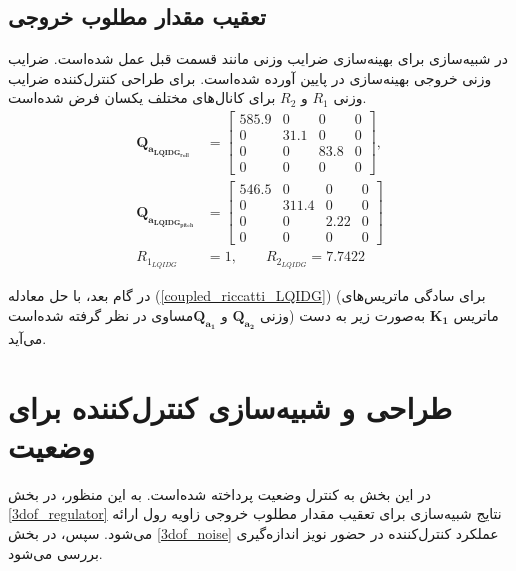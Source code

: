 \documentclass{CCI2020}
\begin{document}
	\subsection{تعقیب مقدار مطلوب خروجی}\label{roll_pitch_regulator}
	
	در شبیه‌سازی برای بهینه‌سازی ضرایب وزنی مانند قسمت قبل عمل شده‌است.
	ضرایب وزنی خروجی بهینه‌سازی در پایین آورده شده‌است. برای طراحی کنترل‌کننده
	ضرایب وزنی
	$R_1$
	و
	$R_2$
	برای کانال‌های مختلف یکسان فرض شده‌است.
	\begin{equation}
		\begin{split}
			\boldsymbol{Q_{a_{LQIDG_{roll}}}} &= \begin{bmatrix}
				585.9 &0& 0& 0\\
				0 &  31.1 & 0 &0 \\
				0 & 0 & 83.8 & 0\\
				0 & 0 & 0 & 0
			\end{bmatrix} ,\\
			\boldsymbol{Q_{a_{LQIDG_{pitch}}}} &= \begin{bmatrix}
				546.5 &0& 0& 0\\
				0 &  311.4 & 0 &0 \\
				0 & 0 & 2.22 & 0\\
				0 & 0 & 0 & 0
			\end{bmatrix}\\
			R_{1_{LQIDG}} &=  1,\qquad  R_{2_{LQIDG}} =  7.7422
		\end{split}
	\end{equation}
	
	در گام بعد، با حل معادله
	(\ref{coupled_riccatti_LQIDG})
	(برای سادگی ماتریس‌های وزنی $\boldsymbol{{Q}_{a_2}}$ و $\boldsymbol{{Q}_{a_1}}$مساوی در نظر گرفته شده‌است)
	ماتریس
	$\boldsymbol{{K}_1}$
	به‌صورت زیر به دست می‌آید.
	
	
	\section{طراحی و شبیه‌سازی کنترل‌کننده برای وضعیت}\label{roll_pitch_yaw_lqidg_section_ll}
	در این بخش به کنترل وضعیت پرداخته شده‌است. به این منظور، در بخش
	\ref{3dof_regulator}
	نتایج شبیه‌سازی برای تعقیب مقدار مطلوب خروجی زاویه رول ارائه می‌شود. سپس، در بخش
	\ref{3dof_noise}
	عملکرد کنترل‌کننده در  حضور نویز اندازه‌گیری بررسی می‌شود.
\end{document}
